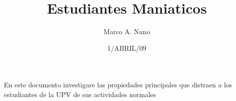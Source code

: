 \documentclass{book}
\title{Estudiantes Maniaticos}
\author{Marco A. Nuno}
\date{1/ABRIL/09}
\begin{document}
\maketitle
En este documento investigare las 
propiedades principales que distraen
a los estudiantes de la UPV de sus
actividades normales
\end{document}
